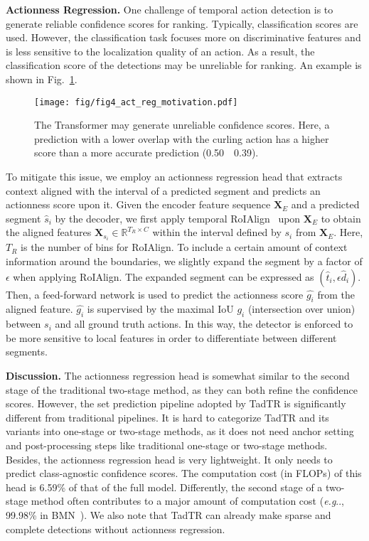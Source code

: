 \documentclass[lettersize,journal]{IEEEtran}
\makeatletter
\DeclareRobustCommand\onedot{\futurelet\@let@token\@onedot}
\def\@onedot{\ifx\@let@token.\else.\null\fi\xspace}
\def\eg{\emph{e.g}\onedot} \def\Eg{\emph{E.g}\onedot}
\def\R{\mathbb{R}}
\makeatother
\begin{document}
\vspace{1ex}\noindent\textbf{Actionness Regression.} 
One challenge of temporal action detection is to generate reliable confidence scores for ranking. Typically, classification scores are used. However, the classification task focuses more on discriminative features and is less sensitive to the localization quality of an action.
As a result, the classification score of the detections may be unreliable for ranking. An example is shown in Fig.~\ref{fig:scoring}. 

\begin{figure}
\centering
\texttt{[image: fig/fig4\_act\_reg\_motivation.pdf]}
\caption{The Transformer may generate unreliable confidence scores. Here, a prediction with a lower overlap with the curling action has a higher score than a more accurate prediction (0.50~\vs~0.39).}
\label{fig:scoring}
\end{figure}

To mitigate this issue, we employ an actionness regression head that extracts context aligned with the interval of a predicted segment and predicts an actionness score upon it. 
Given the encoder feature sequence $\boldsymbol{X}_E$ and a predicted segment $\hat{s}_i$ by the decoder, we first apply temporal RoIAlign~\cite{he2017mask} upon $\boldsymbol{X}_E$ to obtain the aligned features $\boldsymbol{X}_{s_i}\in\R^{T_R \times C}$ within the interval defined by $s_i$ from $\boldsymbol{X}_E$.
Here, $T_R$ is the number of bins for RoIAlign. 
To include a certain amount of context information around the boundaries, we slightly expand the segment by a factor of $\epsilon$ when applying RoIAlign. The expanded segment can be expressed as $(\hat{t}_i, \epsilon \hat{d}_i)$.
Then, a feed-forward network is used to predict the actionness score $\hat{g_i}$ from the aligned feature. $\hat{g_i}$ is supervised by the maximal IoU $g_i$ (intersection over union) between $s_i$ and all ground truth actions. In this way, the detector is enforced to be more sensitive to local features in order to differentiate between different segments.

\vspace{1ex}\noindent\textbf{Discussion.} The actionness regression head is somewhat similar to the second stage of the traditional two-stage method, as they can both refine the confidence scores. However, the set prediction pipeline adopted by TadTR is significantly different from traditional pipelines. It is hard to categorize TadTR and its variants into one-stage or two-stage methods, as it does not need anchor setting and post-processing steps like traditional one-stage or two-stage methods. 
Besides, the actionness regression head is very lightweight. It only needs to predict class-agnostic confidence scores. The computation cost (in FLOPs) of this head is 6.59\% of that of the full model.
Differently, the second stage of a two-stage method often contributes to a major amount of computation cost (\eg, 99.98\% in BMN~\cite{lin2019bmn}). We also note that TadTR can already make sparse and complete detections without actionness regression.
\end{document}
